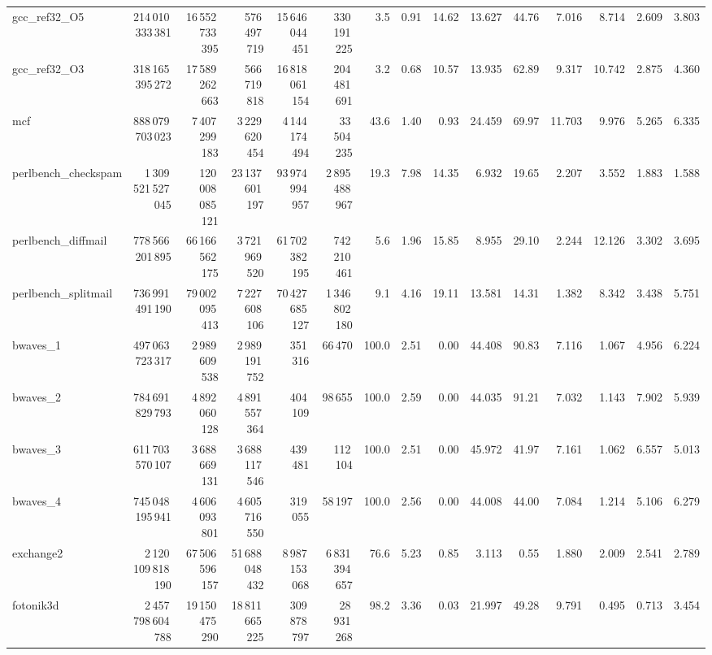 \documentclass[9pt,landscape,a4paper]{article}
\begin{document}
\begin{adjustbox}{max width=\textwidth, max totalheight=0.50\textheight}
\begin{tabular}{lrrrrrrrrrrrrrr}
gcc\_ref32\_O5 & 214\,010\,333\,381 & 16\,552\,733\,395 & 576\,497\,719 & 15\,646\,044\,451 & 330\,191\,225 & 3.5 & 0.91 & 14.62 & 13.627 & 44.76 & 7.016 & 8.714 & 2.609 & 3.803 \\
gcc\_ref32\_O3 & 318\,165\,395\,272 & 17\,589\,262\,663 & 566\,719\,818 & 16\,818\,061\,154 & 204\,481\,691 & 3.2 & 0.68 & 10.57 & 13.935 & 62.89 & 9.317 & 10.742 & 2.875 & 4.360 \\
mcf & 888\,079\,703\,023 & 7\,407\,299\,183 & 3\,229\,620\,454 & 4\,144\,174\,494 & 33\,504\,235 & 43.6 & 1.40 & 0.93 & 24.459 & 69.97 & 11.703 & 9.976 & 5.265 & 6.335 \\
perlbench\_checkspam & 1\,309\,521\,527\,045 & 120\,008\,085\,121 & 23\,137\,601\,197 & 93\,974\,994\,957 & 2\,895\,488\,967 & 19.3 & 7.98 & 14.35 & 6.932 & 19.65 & 2.207 & 3.552 & 1.883 & 1.588 \\
perlbench\_diffmail & 778\,566\,201\,895 & 66\,166\,562\,175 & 3\,721\,969\,520 & 61\,702\,382\,195 & 742\,210\,461 & 5.6 & 1.96 & 15.85 & 8.955 & 29.10 & 2.244 & 12.126 & 3.302 & 3.695 \\
perlbench\_splitmail & 736\,991\,491\,190 & 79\,002\,095\,413 & 7\,227\,608\,106 & 70\,427\,685\,127 & 1\,346\,802\,180 & 9.1 & 4.16 & 19.11 & 13.581 & 14.31 & 1.382 & 8.342 & 3.438 & 5.751 \\
bwaves\_1 & 497\,063\,723\,317 & 2\,989\,609\,538 & 2\,989\,191\,752 & 351\,316 & 66\,470 & 100.0 & 2.51 & 0.00 & 44.408 & 90.83 & 7.116 & 1.067 & 4.956 & 6.224 \\
bwaves\_2 & 784\,691\,829\,793 & 4\,892\,060\,128 & 4\,891\,557\,364 & 404\,109 & 98\,655 & 100.0 & 2.59 & 0.00 & 44.035 & 91.21 & 7.032 & 1.143 & 7.902 & 5.939 \\
bwaves\_3 & 611\,703\,570\,107 & 3\,688\,669\,131 & 3\,688\,117\,546 & 439\,481 & 112\,104 & 100.0 & 2.51 & 0.00 & 45.972 & 41.97 & 7.161 & 1.062 & 6.557 & 5.013 \\
bwaves\_4 & 745\,048\,195\,941 & 4\,606\,093\,801 & 4\,605\,716\,550 & 319\,055 & 58\,197 & 100.0 & 2.56 & 0.00 & 44.008 & 44.00 & 7.084 & 1.214 & 5.106 & 6.279 \\
exchange2 & 2\,120\,109\,818\,190 & 67\,506\,596\,157 & 51\,688\,048\,432 & 8\,987\,153\,068 & 6\,831\,394\,657 & 76.6 & 5.23 & 0.85 & 3.113 & 0.55 & 1.880 & 2.009 & 2.541 & 2.789 \\
fotonik3d & 2\,457\,798\,604\,788 & 19\,150\,475\,290 & 18\,811\,665\,225 & 309\,878\,797 & 28\,931\,268 & 98.2 & 3.36 & 0.03 & 21.997 & 49.28 & 9.791 & 0.495 & 0.713 & 3.454 \\

\end{tabular}
\end{adjustbox}
\end{document}
